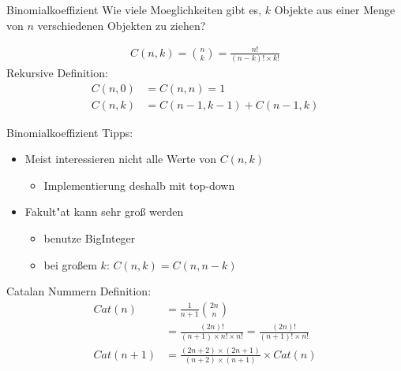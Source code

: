 \documentclass[18pt]{beamer}
\begin{document}
\begin{frame}{Binomialkoeffizient}
Wie viele Moeglichkeiten gibt es, $k$ Objekte aus einer Menge von $n$ verschiedenen Objekten zu ziehen?

\begin{align*}
C\left( n,k \right) = \binom{n}{k} = \frac{n!}{\left( n-k \right) ! \times k!}
\end{align*}
Rekursive Definition:
\begin{align*}
C\left( n, 0 \right) &= C\left( n,n \right) = 1 \\
C\left( n,k \right) &= C\left( n-1,k-1 \right) + C\left( n-1,k \right)
\end{align*} %

\end{frame}

\begin{frame}{Binomialkoeffizient}
Tipps:
\begin{itemize}
\item Meist interessieren nicht alle Werte von $C \left( n, k \right)$
\begin{itemize}
\item Implementierung deshalb mit top-down
\end{itemize}
\item Fakult"at kann sehr groß werden
\begin{itemize}
\item benutze BigInteger
\item bei großem $k$: $C \left( n, k \right) = C \left( n, n-k \right)$
\end{itemize}
\end{itemize}
\end{frame}

\begin{frame}{Catalan Nummern}
Definition:
\begin{align*}
Cat \left( n \right) &= \frac{1}{n+1} \binom{2n}{n} \\
&= \frac{\left( 2n \right)!}{\left( n+1 \right) \times n! \times n!} = \frac{\left( 2n \right) !}{\left( n+1 \right) ! \times n!} \\
Cat \left( n + 1 \right) &= \frac{\left( 2n + 2 \right) \times \left( 2n + 1 \right)}{\left( n + 2 \right) \times \left( n + 1 \right)} \times Cat \left( n \right)
\end{align*}
\end{frame}
\end{document}
